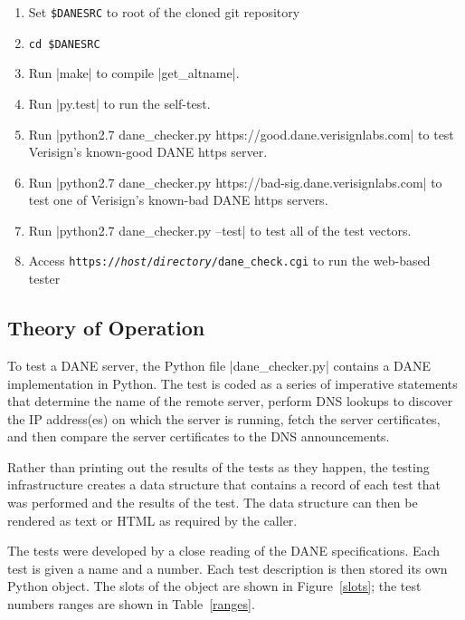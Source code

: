\documentclass[preprint,3p]{elsarticle}
\begin{document}
\begin{enumerate}
\item Set \verb|$DANESRC| to root of the cloned git repository
\item \verb|cd $DANESRC|
\item Run |make| to compile |get_altname|.
\item Run |py.test| to run the self-test.
\item Run |python2.7 dane_checker.py https://good.dane.verisignlabs.com| to test Verisign's known-good
  DANE https server.
\item Run |python2.7 dane_checker.py https://bad-sig.dane.verisignlabs.com| to test one of Verisign's
  known-bad DANE https servers.
\item Run |python2.7 dane_checker.py --test| to test all of the test vectors.
\item Access \texttt{https://\emph{host}/\emph{directory}/dane\_check.cgi} to run
  the web-based tester
\end{enumerate}


\subsection{Theory of Operation}

To test a DANE server, the Python file |dane_checker.py| contains a
DANE implementation in Python. The test is coded as a series of
imperative statements that determine the name of the remote server,
perform DNS lookups to discover the IP address(es) on which the server
is running, fetch the server certificates, and then compare the server
certificates to the DNS announcements. 

Rather than printing out the results of the tests as they happen, the
testing infrastructure creates a data structure that contains a record
of each test that was performed and the results of the test. The
data structure can then be rendered as text or HTML as required by the
caller. 

The tests were developed by a
close reading of the DANE specifications. Each test is given a name
and a number. Each test description is then stored its own Python
object. The slots of the object are shown in Figure~\ref{slots}; the
test numbers ranges are shown in Table~\ref{ranges}.
\begin{table}
\centering{}
\caption{Slots in the DaneTest object}\label{slots}
\end{table}
\end{document}
